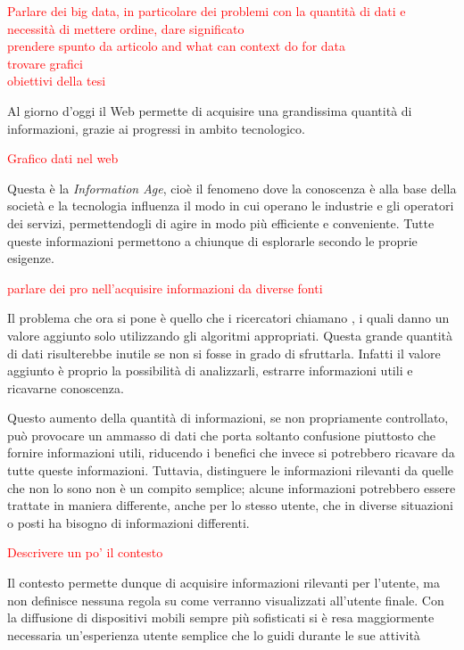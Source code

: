 \textcolor{red}{Parlare dei big data, in particolare dei problemi con la quantità di dati e necessità di mettere ordine, dare significato\\
	prendere spunto da articolo and what can context do for data\\
	trovare grafici\\
	obiettivi della tesi}

Al giorno d'oggi il Web permette di acquisire una grandissima quantità di informazioni, grazie ai progressi in ambito tecnologico. 

\textcolor{red}{Grafico dati nel web} 

Questa è la \emph{Information Age}, cioè il fenomeno dove la conoscenza è alla base della società e la tecnologia influenza il modo in cui operano le industrie e gli operatori dei servizi, permettendogli di agire in modo più efficiente e conveniente. Tutte queste informazioni permettono a chiunque di esplorarle secondo le proprie esigenze. 

\textcolor{red}{parlare dei pro nell'acquisire informazioni da diverse fonti}

Il problema che ora si pone è quello che i ricercatori chiamano , i quali danno un valore aggiunto solo utilizzando gli algoritmi appropriati. Questa grande quantità di dati risulterebbe inutile se non si fosse in grado di sfruttarla. Infatti il valore aggiunto è proprio la possibilità di analizzarli, estrarre informazioni utili e ricavarne conoscenza. 

Questo aumento della quantità di informazioni, se non propriamente controllato, può provocare un ammasso di dati che porta soltanto confusione piuttosto che fornire informazioni utili, riducendo i benefici che invece si potrebbero ricavare da tutte queste informazioni. Tuttavia, distinguere le informazioni rilevanti da quelle che non lo sono non è un compito semplice; alcune informazioni potrebbero essere trattate in maniera differente, anche per lo stesso utente, che in diverse situazioni o posti ha bisogno di informazioni differenti. 

\textcolor{red}{Descrivere un po' il contesto}


Il contesto permette dunque di acquisire informazioni rilevanti per l'utente, ma non definisce nessuna regola su come verranno visualizzati all'utente finale. Con la diffusione di dispositivi mobili sempre più sofisticati si è resa maggiormente necessaria un'esperienza utente semplice che lo guidi durante le sue attività 

